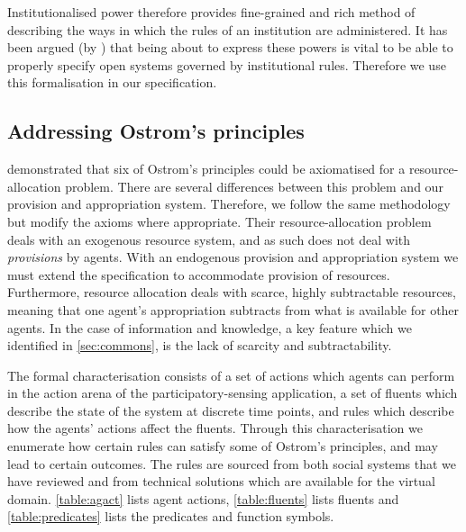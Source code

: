 Institutionalised power therefore provides fine-grained and rich method of
describing the ways in which the rules of an institution are administered. It
has been argued (by \citet{Artikis2009a}) that being about to express these
powers is vital to be able to properly specify open systems governed by
institutional rules. Therefore we use this formalisation in our specification.

\subsection{Addressing Ostrom's principles}
%

 demonstrated that six of Ostrom's principles could be axiomatised for a resource-allocation problem. There are several differences between this problem and our provision and appropriation system. 
Therefore, we follow the same methodology but modify the axioms where appropriate. 
Their resource-allocation problem deals with an exogenous resource system, and as such does not deal with \emph{provisions} by agents. With an endogenous provision and appropriation system we must extend the specification to accommodate provision of resources.
Furthermore, resource allocation deals with scarce, highly subtractable resources, meaning that  one agent's appropriation subtracts from what is available for other agents. 
In the case of information and knowledge, a key feature which we identified in \autoref{sec:commons}, is the lack of scarcity and subtractability. 

The formal characterisation consists of a set of actions which agents can perform in the action arena of the participatory-sensing application, a set of fluents which describe the state of the system at discrete time points, and rules which describe how the agents' actions affect the fluents. Through this characterisation we enumerate how certain rules can satisfy some of Ostrom's principles, and may lead to certain outcomes. The rules are sourced from both social systems that we have reviewed and from technical solutions which are available for the virtual domain. \autoref{table:agact} lists agent actions, \autoref{table:fluents} lists fluents and \autoref{table:predicates} lists the
predicates and function symbols.

